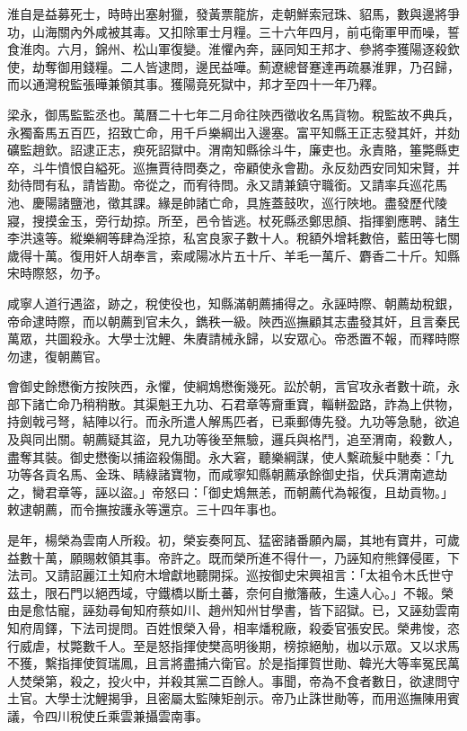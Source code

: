 \begin{pinyinscope}
淮自是益募死士，時時出塞射獵，發黃票龍旂，走朝鮮索冠珠、貂馬，數與邊將爭功，山海關內外咸被其毒。又扣除軍士月糧。三十六年四月，前屯衛軍甲而噪，誓食淮肉。六月，錦州、松山軍復變。淮懼內奔，誣同知王邦才、參將李獲陽逐殺欽使，劫奪御用錢糧。二人皆逮問，邊民益嘩。薊遼總督蹇達再疏暴淮罪，乃召歸，而以通灣稅監張曄兼領其事。獲陽竟死獄中，邦才至四十一年乃釋。

梁永，御馬監監丞也。萬曆二十七年二月命往陜西徵收名馬貨物。稅監故不典兵，永獨畜馬五百匹，招致亡命，用千戶樂綱出入邊塞。富平知縣王正志發其奸，并劾礦監趙欽。詔逮正志，瘐死詔獄中。渭南知縣徐斗牛，廉吏也。永責賂，箠斃縣吏卒，斗牛憤恨自縊死。巡撫賈待問奏之，帝顧使永會勘。永反劾西安同知宋賢，并劾待問有私，請皆勘。帝從之，而宥待問。永又請兼鎮守職銜。又請率兵巡花馬池、慶陽諸鹽池，徵其課。緣是帥諸亡命，具旌蓋鼓吹，巡行陜地。盡發歷代陵寢，搜摸金玉，旁行劫掠。所至，邑令皆逃。杖死縣丞鄭思顏、指揮劉應聘、諸生李洪遠等。縱樂綱等肆為淫掠，私宮良家子數十人。稅額外增耗數倍，藍田等七關歲得十萬。復用奸人胡奉言，索咸陽冰片五十斤、羊毛一萬斤、麝香二十斤。知縣宋時際怒，勿予。

咸寧人道行遇盜，跡之，稅使役也，知縣滿朝薦捕得之。永誣時際、朝薦劫稅銀，帝命逮時際，而以朝薦到官未久，鐫秩一級。陜西巡撫顧其志盡發其奸，且言秦民萬眾，共圖殺永。大學士沈鯉、朱賡請械永歸，以安眾心。帝悉置不報，而釋時際勿逮，復朝薦官。

會御史餘懋衡方按陜西，永懼，使綱鴆懋衡幾死。訟於朝，言官攻永者數十疏，永部下諸亡命乃稍稍散。其渠魁王九功、石君章等齎重寶，輜軿盈路，詐為上供物，持劍戟弓弩，結陣以行。而永所遣人解馬匹者，已乘郵傳先發。九功等急馳，欲追及與同出關。朝薦疑其盜，見九功等後至無驗，邏兵與格鬥，追至渭南，殺數人，盡奪其裝。御史懋衡以捕盜殺傷聞。永大窘，聽樂綱謀，使人繫疏髮中馳奏：「九功等各貢名馬、金珠、睛綠諸寶物，而咸寧知縣朝薦承餘御史指，伏兵渭南遮劫之，臠君章等，誣以盜。」帝怒曰：「御史鴆無恙，而朝薦代為報復，且劫貢物。」敕逮朝薦，而令撫按護永等還京。三十四年事也。

是年，楊榮為雲南人所殺。初，榮妄奏阿瓦、猛密諸番願內屬，其地有寶井，可歲益數十萬，願賜敕領其事。帝許之。既而榮所進不得什一，乃誣知府熊鐸侵匿，下法司。又請詔麗江土知府木增獻地聽開採。巡按御史宋興祖言：「太祖令木氏世守茲土，限石門以絕西域，守鐵橋以斷土蕃，奈何自撤籓蔽，生遠人心。」不報。榮由是愈怙寵，誣劾尋甸知府蔡如川、趙州知州甘學書，皆下詔獄。已，又誣劾雲南知府周鐸，下法司提問。百姓恨榮入骨，相率燔稅廠，殺委官張安民。榮弗悛，恣行威虐，杖斃數千人。至是怒指揮使樊高明後期，榜掠絕觔，枷以示眾。又以求馬不獲，繫指揮使賀瑞鳳，且言將盡捕六衛官。於是指揮賀世勛、韓光大等率冤民萬人焚榮第，殺之，投火中，并殺其黨二百餘人。事聞，帝為不食者數日，欲逮問守土官。大學士沈鯉揭爭，且密屬太監陳矩剖示。帝乃止誅世勛等，而用巡撫陳用賓議，令四川稅使丘乘雲兼攝雲南事。


\end{pinyinscope}
